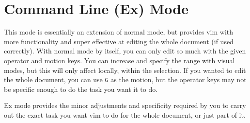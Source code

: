 \section{Command Line (Ex) Mode}

This mode is essentially an extension of normal mode, but provides vim with more functionality and super effective at editing the whole document (if used correctly).
With normal mode by itself, you can only edit so much with the given operator and motion keys.
You can increase and specify the range with visual modes, but this will only affect locally, within the selection.
If you wanted to edit the whole document, you can use \verb|G| as  the motion, but the operator keys may not be specific enough to do the task you want it to do.

Ex mode provides the minor adjustments and specificity required by you to carry out the exact task you want vim to do for the whole document, or just part of it.















